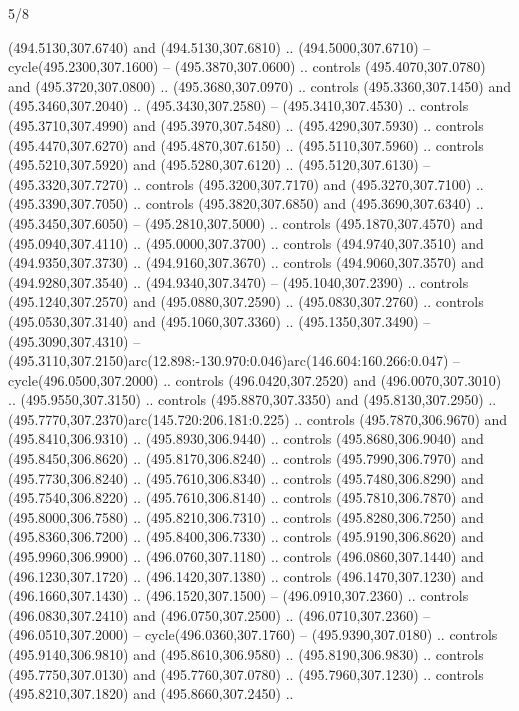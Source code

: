 \begin{flagdescription}{5/8}
\begin{scope}[xshift=0.5\flaglength,yshift=0.5\flagwidth,scale=\flagwidth/475.63]
\begin{scope}[y=0.8pt, x=0.8pt, yscale=-1, xscale=1,shift={(-450,-300)}]
\begin{scope}[cm={{1.0,0.0,0.0,1.0,(-0.0002,0.12556)}},cm={{1.0,0.0,0.0,1.0,(0.00179,0.0)}}]
\begin{scope}[cm={{1.11592,0.0,0.0,1.11592,(-106.89933,-41.77764)}}]
\begin{scope}[draw=black,fill=cfff]
\begin{scope}[fill=black]
  (494.5130,307.6740) and (494.5130,307.6810) .. (494.5000,307.6710) --
  cycle(495.2300,307.1600) -- (495.3870,307.0600) .. controls
  (495.4070,307.0780) and (495.3720,307.0800) .. (495.3680,307.0970) .. controls
  (495.3360,307.1450) and (495.3460,307.2040) .. (495.3430,307.2580) --
  (495.3410,307.4530) .. controls (495.3710,307.4990) and (495.3970,307.5480) ..
  (495.4290,307.5930) .. controls (495.4470,307.6270) and (495.4870,307.6150) ..
  (495.5110,307.5960) .. controls (495.5210,307.5920) and (495.5280,307.6120) ..
  (495.5120,307.6130) -- (495.3320,307.7270) .. controls (495.3200,307.7170) and
  (495.3270,307.7100) .. (495.3390,307.7050) .. controls (495.3820,307.6850) and
  (495.3690,307.6340) .. (495.3450,307.6050) -- (495.2810,307.5000) .. controls
  (495.1870,307.4570) and (495.0940,307.4110) .. (495.0000,307.3700) .. controls
  (494.9740,307.3510) and (494.9350,307.3730) .. (494.9160,307.3670) .. controls
  (494.9060,307.3570) and (494.9280,307.3540) .. (494.9340,307.3470) --
  (495.1040,307.2390) .. controls (495.1240,307.2570) and (495.0880,307.2590) ..
  (495.0830,307.2760) .. controls (495.0530,307.3140) and (495.1060,307.3360) ..
  (495.1350,307.3490) -- (495.3090,307.4310) --
  (495.3110,307.2150)arc(12.898:-130.970:0.046)arc(146.604:160.266:0.047) --
  cycle(496.0500,307.2000) .. controls (496.0420,307.2520) and
  (496.0070,307.3010) .. (495.9550,307.3150) .. controls (495.8870,307.3350) and
  (495.8130,307.2950) .. (495.7770,307.2370)arc(145.720:206.181:0.225) ..
  controls (495.7870,306.9670) and (495.8410,306.9310) .. (495.8930,306.9440) ..
  controls (495.8680,306.9040) and (495.8450,306.8620) .. (495.8170,306.8240) ..
  controls (495.7990,306.7970) and (495.7730,306.8240) .. (495.7610,306.8340) ..
  controls (495.7480,306.8290) and (495.7540,306.8220) .. (495.7610,306.8140) ..
  controls (495.7810,306.7870) and (495.8000,306.7580) .. (495.8210,306.7310) ..
  controls (495.8280,306.7250) and (495.8360,306.7200) .. (495.8400,306.7330) ..
  controls (495.9190,306.8620) and (495.9960,306.9900) .. (496.0760,307.1180) ..
  controls (496.0860,307.1440) and (496.1230,307.1720) .. (496.1420,307.1380) ..
  controls (496.1470,307.1230) and (496.1660,307.1430) .. (496.1520,307.1500) --
  (496.0910,307.2360) .. controls (496.0830,307.2410) and (496.0750,307.2500) ..
  (496.0710,307.2360) -- (496.0510,307.2000) -- cycle(496.0360,307.1760) --
  (495.9390,307.0180) .. controls (495.9140,306.9810) and (495.8610,306.9580) ..
  (495.8190,306.9830) .. controls (495.7750,307.0130) and (495.7760,307.0780) ..
  (495.7960,307.1230) .. controls (495.8210,307.1820) and (495.8660,307.2450) ..

\end{scope}
\end{scope}
\end{scope}
\end{scope}
\end{scope}
\end{scope}
\end{flagdescription}
